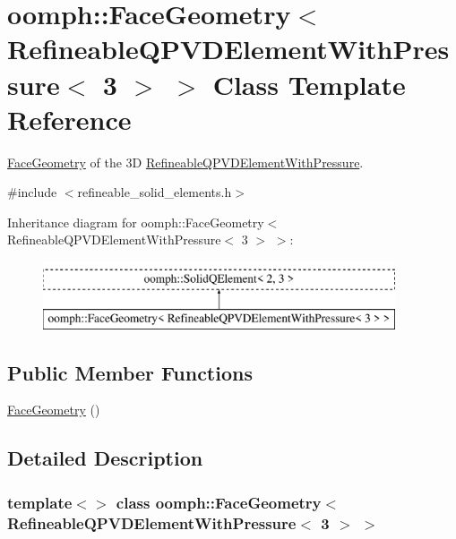 \hypertarget{classoomph_1_1FaceGeometry_3_01RefineableQPVDElementWithPressure_3_013_01_4_01_4}{}\section{oomph\+:\+:Face\+Geometry$<$ Refineable\+Q\+P\+V\+D\+Element\+With\+Pressure$<$ 3 $>$ $>$ Class Template Reference}
\label{classoomph_1_1FaceGeometry_3_01RefineableQPVDElementWithPressure_3_013_01_4_01_4}


\hyperlink{classoomph_1_1FaceGeometry}{Face\+Geometry} of the 3D \hyperlink{classoomph_1_1RefineableQPVDElementWithPressure}{Refineable\+Q\+P\+V\+D\+Element\+With\+Pressure}.  




{\ttfamily \#include $<$refineable\+\_\+solid\+\_\+elements.\+h$>$}

Inheritance diagram for oomph\+:\+:Face\+Geometry$<$ Refineable\+Q\+P\+V\+D\+Element\+With\+Pressure$<$ 3 $>$ $>$\+:\begin{figure}[H]
\begin{center}
\leavevmode
\includegraphics[height=2.000000cm]{classoomph_1_1FaceGeometry_3_01RefineableQPVDElementWithPressure_3_013_01_4_01_4}
\end{center}
\end{figure}
\subsection*{Public Member Functions}
\begin{DoxyCompactItemize}
\item 
\hyperlink{classoomph_1_1FaceGeometry_3_01RefineableQPVDElementWithPressure_3_013_01_4_01_4_af2338c354e59493098ff39f995bd4000}{Face\+Geometry} ()
\end{DoxyCompactItemize}


\subsection{Detailed Description}
\subsubsection*{template$<$$>$\newline
class oomph\+::\+Face\+Geometry$<$ Refineable\+Q\+P\+V\+D\+Element\+With\+Pressure$<$ 3 $>$ $>$}

